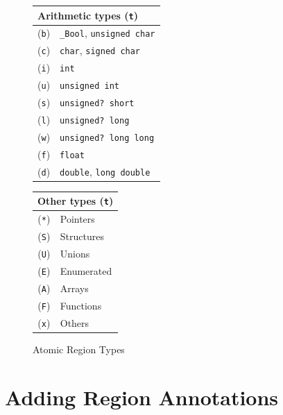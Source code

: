 \begin{figure}[htpb]
\begin{center}
\begin{tabular}[t]{cl}
\multicolumn{2}{l}{\textbf{Arithmetic types} (\texttt{t})}\\\hline
(\verb$b$) & \verb$_Bool$, \verb$unsigned char$ \rule{0pt}{15pt}\\
(\verb$c$) & \verb$char$, \verb$signed char$ \\
(\verb$i$) & \verb$int$ \\
(\verb$u$) & \verb$unsigned int$ \\
(\verb$s$) & \verb$unsigned? short$ \\
(\verb$l$) & \verb$unsigned? long$ \\
(\verb$w$) & \verb$unsigned? long long$ \\
(\verb$f$) & \verb$float$ \\
(\verb$d$) & \verb$double$, \verb+long double+\\
\end{tabular}
\quad\quad
\begin{tabular}[t]{cl}
\multicolumn{2}{l}{\textbf{Other types} (\texttt{t})}\\\hline
(\verb$*$) & Pointers \rule{0pt}{15pt}\\
(\verb$S$) & Structures \\
(\verb$U$) & Unions \\
(\verb$E$) & Enumerated \\
(\verb$A$) & Arrays \\
(\verb$F$) & Functions \\
(\verb$x$) & Others \\
\end{tabular}
\end{center}
\caption{Atomic Region Types}
\label{fig:types}
\end{figure}

\section{Adding Region Annotations}
\label{toc:annotations}

